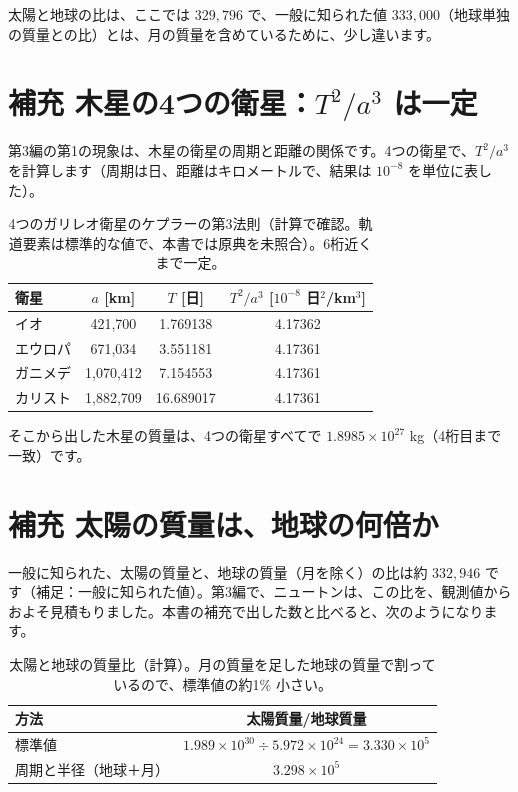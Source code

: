 \documentclass[a4paper,11pt,openany]{ltjsbook}
\begin{document}
太陽と地球の比は、ここでは $329{,}796$ で、一般に知られた値 $333{,}000$（地球単独の質量との比）とは、月の質量を含めているために、少し違います。

\section{補充 木星の4つの衛星：$T^2/a^3$ は一定}

第3編の第1の現象は、木星の衛星の周期と距離の関係です。4つの衛星で、$T^2/a^3$ を計算します（周期は日、距離はキロメートルで、結果は $10^{-8}$ を単位に表した）。

\begin{table}[htbp]
\centering
\begin{tabular}{lccc}
\toprule
衛星 & $a$ [km] & $T$ [日] & $T^2/a^3$ [$10^{-8}$ 日$^2$/km$^3$]\\
\midrule
イオ & 421{,}700 & 1.769138 & 4.17362\\
エウロパ & 671{,}034 & 3.551181 & 4.17361\\
ガニメデ & 1{,}070{,}412 & 7.154553 & 4.17361\\
カリスト & 1{,}882{,}709 & 16.689017 & 4.17361\\
\bottomrule
\end{tabular}
\caption{4つのガリレオ衛星のケプラーの第3法則（計算で確認。軌道要素は標準的な値で、本書では原典を未照合）。6桁近くまで一定。}
\end{table}

そこから出した木星の質量は、4つの衛星すべてで $1.8985\times10^{27}$ kg（4桁目まで一致）です。

\section{補充 太陽の質量は、地球の何倍か}

一般に知られた、太陽の質量と、地球の質量（月を除く）の比は約 $332{,}946$ です（補足：一般に知られた値）。第3編で、ニュートンは、この比を、観測値からおよそ見積もりました。本書の補充で出した数と比べると、次のようになります。

\begin{table}[htbp]
\centering
\begin{tabular}{lc}
\toprule
方法 & 太陽質量/地球質量\\
\midrule
標準値 & $1.989\times10^{30}\div5.972\times10^{24}=3.330\times10^5$\\
周期と半径（地球＋月） & $3.298\times10^5$\\
\bottomrule
\end{tabular}
\caption{太陽と地球の質量比（計算）。月の質量を足した地球の質量で割っているので、標準値の約1\% 小さい。}
\end{table}
\end{document}
